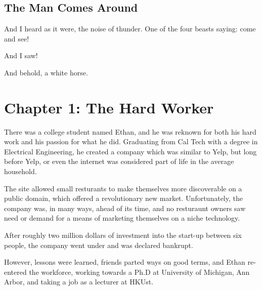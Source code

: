 \documentclass[a4paper,12pt,twoside]{book}
\begin{document}
\section{The Man Comes Around}
And I heard as it were, the noise of thunder.  One of the four beasts saying: come and see!

And I saw! 

And behold, a white horse.

\chapter{Chapter 1: The Hard Worker}
There was a college student named Ethan, and he was reknown for both his hard work and his passion for what he did.  Graduating from Cal Tech with a degree in Electrical Engineering, he created a company which was similar to Yelp, but long before Yelp, or even the internet was considered part of life in the average household.  

The site allowed small resturants to make themselves more discoverable on a public domain, which offered a revolutionary new market.  Unfortunately, the company was, in many ways, ahead of its time, and no resturaunt owners saw need or demand for a means of marketing themselves on a niche technology. 

After roughly two million dollars of investment into the start-up between six people, the company went under and was declared bankrupt.  


However, lessons were learned, friends parted ways on good terms, and Ethan re-entered the workforce, working towards a Ph.D at University of Michigan, Ann Arbor, and taking a job as a lecturer at HKUst.

 
\end{document}
